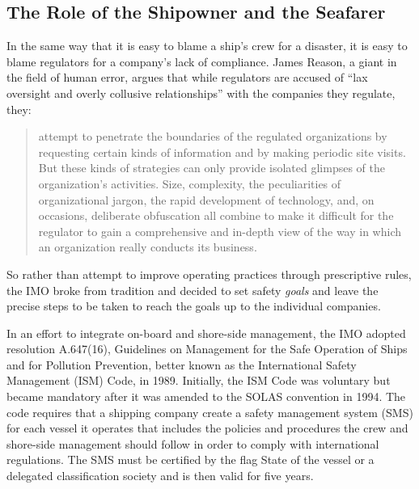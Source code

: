\documentclass[twoside,symmetric,notoc]{tufte-book}
\begin{document}
\subsection{The Role of the Shipowner and the Seafarer}
\par{%
In the same way that it is easy to blame a ship's crew for a disaster, it is easy to blame regulators for a company's lack of compliance. James Reason, a giant in the field of human error, argues that while regulators are accused of ``lax oversight and overly collusive relationships'' with the companies they regulate, they:
\newpage
\begin{quotation}
attempt to penetrate the boundaries of the regulated organizations by requesting certain kinds of information and by making periodic site visits. But these kinds of strategies can only provide isolated glimpses of the organization's activities. Size, complexity, the peculiarities of organizational jargon, the rapid development of technology, and, on occasions, deliberate obfuscation all combine to make it difficult for the regulator to gain a comprehensive and in-depth view of the way in which an organization really conducts its business.
\end{quotation} 
So rather than attempt to improve operating practices through prescriptive rules, the IMO broke from tradition and decided to set safety \textit{goals} and leave the precise steps to be taken to reach the goals up to the individual companies.   
}
\par{%
In an effort to integrate on-board and shore-side management, the IMO adopted resolution A.647(16), Guidelines on Management for the Safe Operation of Ships and for Pollution Prevention, better known as the International Safety Management (ISM) Code, in 1989. Initially, the ISM Code was voluntary but became mandatory after it was amended to the SOLAS convention in 1994. The code requires that a shipping company create a safety management system (SMS) for each vessel it operates that includes the policies and procedures the crew and shore-side management should follow in order to comply with international regulations. The SMS must be certified by the flag State of the vessel or a delegated classification society and is then valid for five years.\cite{Boisson}\cite{Anderson}
}
\end{document}
